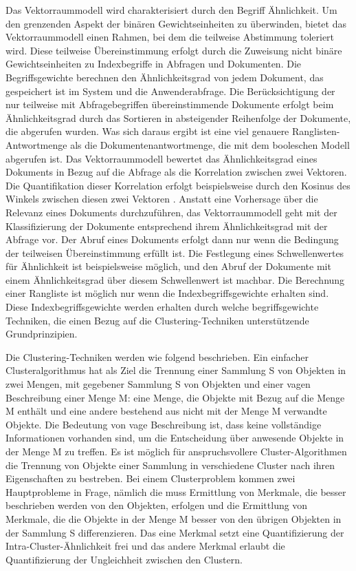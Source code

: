 \begin{itemize}
Das Vektorraummodell wird charakterisiert durch den Begriff Ähnlichkeit. Um den grenzenden Aspekt der binären Gewichtseinheiten zu überwinden, bietet das Vektorraummodell einen Rahmen, bei dem die teilweise Abstimmung toleriert wird. Diese teilweise Übereinstimmung erfolgt durch die Zuweisung nicht binäre Gewichtseinheiten zu Indexbegriffe in Abfragen und Dokumenten. Die Begriffsgewichte berechnen den Ähnlichkeitsgrad von jedem Dokument, das gespeichert ist im System und die Anwenderabfrage. Die Berücksichtigung der nur teilweise mit Abfragebegriffen übereinstimmende Dokumente erfolgt beim Ähnlichkeitsgrad durch das Sortieren in absteigender Reihenfolge der Dokumente, die abgerufen wurden. Was sich daraus ergibt ist eine viel genauere Ranglisten-Antwortmenge als die Dokumentenantwortmenge, die mit dem booleschen Modell abgerufen ist. Das Vektorraummodell bewertet das Ähnlichkeitsgrad eines Dokuments in Bezug auf die Abfrage als die Korrelation zwischen zwei Vektoren. Die Quantifikation dieser Korrelation erfolgt beispielsweise durch den Kosinus des Winkels zwischen diesen zwei Vektoren \cite{BRI99}. Anstatt eine Vorhersage über die Relevanz eines Dokuments durchzuführen, das Vektorraummodell geht mit der Klassifizierung der Dokumente entsprechend ihrem Ähnlichkeitsgrad mit der Abfrage vor. Der Abruf eines Dokuments erfolgt dann nur wenn die Bedingung der teilweisen Übereinstimmung erfüllt ist. Die Festlegung eines Schwellenwertes für Ähnlichkeit ist beispielsweise möglich, und den Abruf der Dokumente mit einem Ähnlichkeitsgrad über diesem Schwellenwert ist machbar. Die Berechnung einer Rangliste ist möglich nur wenn die Indexbegriffsgewichte erhalten sind. Diese Indexbegriffsgewichte werden erhalten durch welche begriffsgewichte Techniken, die einen Bezug auf die Clustering-Techniken unterstützende Grundprinzipien.

Die Clustering-Techniken werden wie folgend beschrieben. Ein einfacher Clusteralgorithmus hat als Ziel die Trennung einer Sammlung S von Objekten in zwei Mengen, mit gegebener Sammlung S von Objekten und einer vagen Beschreibung einer Menge M: eine Menge, die Objekte mit Bezug auf die Menge M enthält und eine andere bestehend aus nicht mit der Menge M verwandte Objekte. Die Bedeutung von vage Beschreibung ist, dass keine vollständige Informationen vorhanden sind, um die Entscheidung über anwesende Objekte in der Menge M zu treffen. Es ist möglich für anspruchsvollere Cluster-Algorithmen die Trennung von Objekte einer Sammlung in verschiedene Cluster nach ihren Eigenschaften zu bestreben. Bei einem Clusterproblem kommen zwei Hauptprobleme in Frage, nämlich die muss Ermittlung von Merkmale, die besser beschrieben werden von den Objekten, erfolgen und die Ermittlung von Merkmale, die die Objekte in der Menge M besser von den übrigen Objekten in der Sammlung S differenzieren. Das eine Merkmal setzt eine Quantifizierung der Intra-Cluster-Ähnlichkeit frei und das andere Merkmal erlaubt die Quantifizierung der Ungleichheit zwischen den Clustern. 


\end{itemize}
